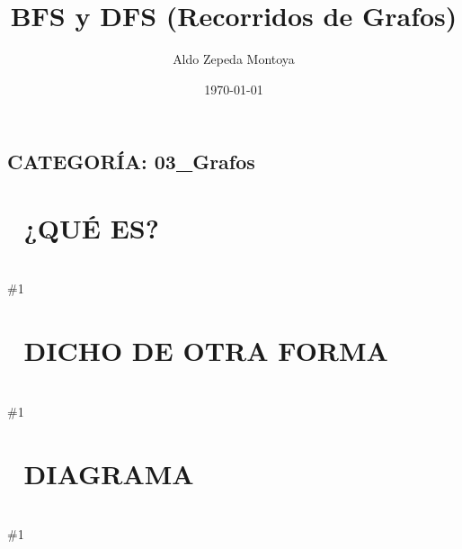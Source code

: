 \documentclass{article}
\newcommand{\quees}[1]{
    \section*{🤔 ¿QUÉ ES?}
    \hrulefill \\
    \#1
}
\newcommand{\dichodeotraforma}[1]{
    \section*{💬 DICHO DE OTRA FORMA}
    \hrulefill \\
    \#1
}
\newcommand{\diagrama}[1]{
    \section*{🎨 DIAGRAMA}
    \hrulefill \\
    \#1
}
\begin{document}
\title{BFS y DFS (Recorridos de Grafos)}
\author{Aldo Zepeda Montoya}
\date{\today}
\maketitle

\subsection*{CATEGORÍA: 03\_Grafos}

\quees{
Dos formas de explorar un mundo desconocido 🗺️:

1. BFS (Breadth-First Search): Como lanzar una piedra al agua 💧. 
   Ves las ondas expandirse nivel por nivel. Primero visitas a todos
   tus vecinos directos, luego a los vecinos de tus vecinos, y así 
   sucesivamente. ¡No dejas a nadie atrás en tu nivel!

2. DFS (Depth-First Search): Como explorar un laberinto 🌀. Sigues
   un solo camino hasta el fondo, hasta que ya no puedas avanzar. 
   Cuando llegas a un callejón sin salida, regresas (backtrack) y 
   pruebas el siguiente camino disponible.
}

\dichodeotraforma{
Son los dos algoritmos fundamentales para recorrer cualquier grafo 
o árbol. 

- BFS usa una Queue (FIFO) y garantiza encontrar el camino más corto
  en grafos no ponderados.
- DFS usa un Stack (LIFO) o Recursión. Es ideal para explorar todas 
  las posibilidades o detectar ciclos.

En ambos casos, es CRUCIAL usar una estructura `visited` (como un array
de bools o un set) para no entrar en bucles infinitos.
}

\diagrama{\begin{verbatim}
Grafo:
    [1]
   /   \
 [2]───[3]
  |     |
 [4]───[5]

BFS desde 1: 1 → 2,3 → 4,5
Orden: [1, 2, 3, 4, 5] (Nivel por nivel)

DFS desde 1: 1 → 2 → 4 → 5 → 3
Orden: [1, 2, 4, 5, 3] (Hasta el fondo)
\end{verbatim}}
\end{document}
